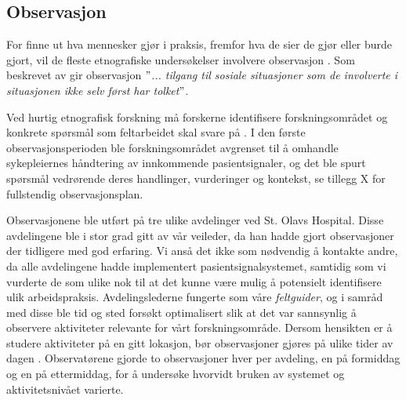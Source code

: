 \subsection{Observasjon}
\label{section:observasjon} 

For finne ut hva mennesker gjør i praksis, fremfor hva de sier de gjør eller burde gjort, vil de fleste etnografiske undersøkelser involvere observasjon \citep{Oates, Blomberg93, Tjora}. Som beskrevet av \citet{Tjora} gir observasjon \textit{$"$... tilgang til sosiale situasjoner som de involverte i situasjonen ikke selv først har tolket$"$}.

\noindent
Ved hurtig etnografisk forskning må forskerne identifisere forskningsområdet og konkrete spørsmål som feltarbeidet skal svare på \citep{Millen00}. I den første observasjonsperioden ble forskningsområdet avgrenset til å omhandle sykepleiernes håndtering av innkommende pasientsignaler, og det ble spurt spørsmål vedrørende deres handlinger, vurderinger og kontekst, se tillegg X for fullstendig observasjonsplan.

\noindent
Observasjonene ble utført på tre ulike avdelinger ved St. Olavs Hospital. Disse avdelingene ble i stor grad gitt av vår veileder, da han hadde gjort observasjoner der tidligere med god erfaring. Vi anså det ikke som nødvendig å kontakte andre, da alle avdelingene hadde implementert pasientsignalsystemet, samtidig som vi vurderte de som ulike nok til at det kunne være mulig å potensielt identifisere ulik arbeidspraksis. Avdelingslederne fungerte som våre \textit{feltguider}, og i samråd med disse ble tid og sted forsøkt optimalisert slik at det var sannsynlig å observere aktiviteter relevante for vårt forskningsområde. Dersom hensikten er å studere aktiviteter på en gitt lokasjon, bør observasjoner gjøres på ulike tider av dagen \citep{Blomberg93}. Observatørene gjorde to observasjoner hver per avdeling, en på formiddag og en på ettermiddag, for å undersøke hvorvidt bruken av systemet og aktivitetsnivået varierte.

